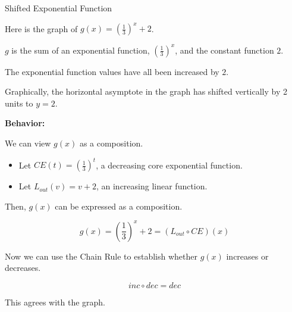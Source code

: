 \documentclass{ximera}
\begin{document}
\begin{example} Shifted Exponential Function



Here is the graph of $g(x) = \left(\frac{1}{3}\right)^x + 2$.

\begin{image}
\end{image}


$g$ is the sum of an exponential function, $\left(\frac{1}{3}\right)^x$, and the constant function $2$. 



The exponential function values have all been increased by $2$.   


Graphically, the horizontal asymptote in the graph has shifted vertically by 2 units to $y=2$.




\textbf{Behavior:}

We can view $g(x)$ as a composition.




\begin{itemize}
\item Let $CE(t) = \left(\frac{1}{3}\right)^t$, a decreasing core exponential function.
\item Let $L_{out}(v) = v + 2$, an increasing linear function.
\end{itemize}

Then, $g(x)$ can be expressed as a composition.


\[
 g(x) = \left(\frac{1}{3}\right)^x + 2 = (L_{out} \circ CE)(x)
\]



Now we can use the Chain Rule to establish whether $g(x)$ increases or decreases.

\[  inc \circ dec = dec \]

This agrees with the graph.

\end{example}
\end{document}
